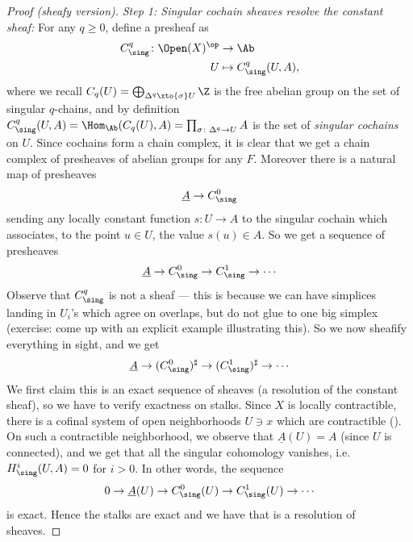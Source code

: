 \documentclass[11pt]{book}
\begin{document}
\begin{proof}[Proof (sheafy version)]
\emph{Step 1: Singular cochain sheaves resolve the constant sheaf:} For any $q\ge 0$, define a presheaf as
\begin{align*}
    C^q_\sing \colon \Open(X)^\op &\to \Ab \\
    U &\mapsto C^q_\sing(U,A),
\end{align*}
where we recall $C_q(U) = \bigoplus_{\Delta^q \xto{\sigma} U}\Z$ is the free abelian group on the set of singular $q$-chains, and by definition $C^q_\sing(U,A) = \Hom_\Ab(C_q(U),A) = \prod_{\sigma \colon \Delta^q \to U}A$ is the set of \emph{singular cochains} on $U$. Since cochains form a chain complex, it is clear that we get a chain complex of presheaves of abelian groups for any $F$. Moreover there is a natural map of presheaves
\begin{align*}
    \underline{A} \to C^0_\sing
\end{align*}
sending any locally constant function $s \colon U \to A$ to the singular cochain which associates, to the point $u\in U$, the value $s(u) \in A$. So we get a sequence of presheaves
\begin{align*}
    \underline{A} \to C^0_\sing \to C^1_\sing \to \cdots
\end{align*}
Observe that $C^q_\sing$ is not a sheaf --- this is because we can have simplices landing in $U_i$'s which agree on overlaps, but do not glue to one big simplex (exercise: come up with an explicit example illustrating this). So we now sheafify everything in sight, and we get
\begin{equation}\label{eqn:singular-resolution-of-const-sheaf}
\begin{aligned}
    \underline{A} \to (C^0_\sing)^\sharp \to (C^1_\sing)^\sharp \to \cdots
\end{aligned}
\end{equation}
We first claim this is an exact sequence of sheaves (a resolution of the constant sheaf), so we have to verify exactness on stalks. Since $X$ is locally contractible, there is a cofinal system of open neighborhoods $U\ni x$ which are contractible (). On such a contractible neighborhood, we observe that $\underline{A}(U) = A$ (since $U$ is connected), and we get that all the singular cohomology vanishes, i.e. $H_\sing^i(U,A) = 0$ for $i>0$. In other words, the sequence
\begin{align*}
    0 \to \underline{A}(U) \to C^0_\sing(U) \to C^1_\sing(U) \to \cdots 
\end{align*}
is exact. Hence the stalks are exact and we have that  is a resolution of sheaves.


\end{proof}
\end{document}
